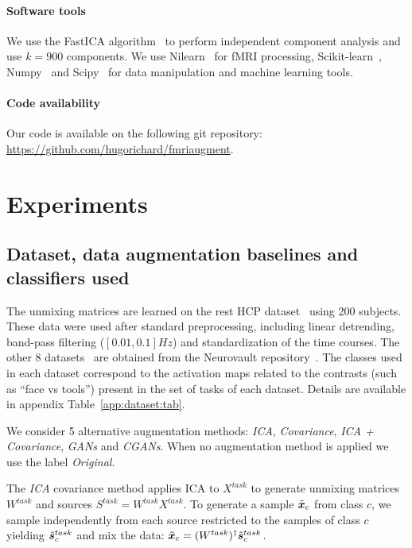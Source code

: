 \paragraph{Software tools}
We use the FastICA algorithm~\cite{hyvarinen_fast_1999} to perform independent component analysis and use $k=900$ components. We use Nilearn~\cite{abraham_machine_2014} for fMRI
processing, Scikit-learn~\cite{pedregosa2011scikit},
Numpy~\cite{harris2020array} and Scipy~\cite{2020SciPy-NMeth} for data
manipulation and machine learning tools.

\paragraph{Code availability}
Our code is available on the following git repository:
\url{https://github.com/hugorichard/fmriaugment}.
%


\section{Experiments}
\subsection{Dataset, data augmentation baselines and classifiers used}
The unmixing matrices are learned on the rest HCP
dataset~\cite{van2013wu} using 200 subjects.
These data were used after standard
preprocessing, including linear detrending, band-pass filtering
($[0.01, 0.1]Hz$) and standardization of the time courses.
The other 8 datasets~\cite{van2013wu, shafto2014cambridge,
  orfanos2017brainomics, pinel2019functional, pinel2007fast, pinel2013genetic,
  poldrack2016phenome, pinel2013genetic} are obtained from the Neurovault repository~\cite{gorgolewski2015neurovault}.
The classes used in each dataset correspond to the activation maps
related to the contrasts (such as ``face vs tools'')
present in the set of tasks of each dataset. Details are available in
appendix Table~\ref{app:dataset:tab}.

We consider 5 alternative
augmentation methods: \emph{ICA}, \emph{Covariance}, \emph{ICA + Covariance}, \emph{GANs} and \emph{CGANs}.
%
When no augmentation method is applied we use the label \emph{Original}.

The \emph{ICA} covariance method applies ICA to $X^{task}$ to generate unmixing matrices $W^{task}$ and
sources $S^{task}=  W^{task} X^{task}$.
%
To generate a sample $\tilde{\boldsymbol{x}}_c$ from class $c$, we sample
independently from each source restricted to the samples of class $c$ yielding $\tilde{\boldsymbol{s}}^{task}_c$ and mix the data: $\tilde{\boldsymbol{x}}_c = (W^{task})^{\dagger}
\tilde{\boldsymbol{s}}^{task}_c$.
%

